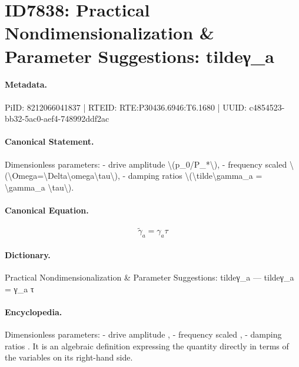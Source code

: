 \section*{ID7838: Practical Nondimensionalization \& Parameter Suggestions: tildeγ\_a}
\paragraph{Metadata.}
PiID: 8212066041837 | RTEID: RTE:P30436.6946:T6.1680 | UUID: c4854523-bb32-5ac0-aef4-748992ddf2ac

\paragraph{Canonical Statement.}
Dimensionless parameters: - drive amplitude \textbackslash{}(p\_0/P\_*\textbackslash{}), - frequency scaled \textbackslash{}(\textbackslash{}Omega=\textbackslash{}Delta\textbackslash{}omega\textbackslash{}tau\textbackslash{}), - damping ratios \textbackslash{}(\textbackslash{}tilde\textbackslash{}gamma\_a = \textbackslash{}gamma\_a \textbackslash{}tau\textbackslash{}).

\paragraph{Canonical Equation.}
\[
\tilde\gamma_a = \gamma_a \tau
\]

\paragraph{Dictionary.}
Practical Nondimensionalization \& Parameter Suggestions: tildeγ\_a — tildeγ\_a = γ\_a τ

\paragraph{Encyclopedia.}
Dimensionless parameters: - drive amplitude , - frequency scaled , - damping ratios . It is an algebraic definition expressing the quantity directly in terms of the variables on its right-hand side.
